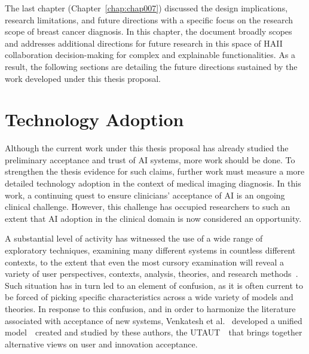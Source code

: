 \clearpage
\label{chap:chap008}

The last chapter (Chapter~\ref{chap:chap007}) discussed the design implications, research limitations, and future directions with a specific focus on the research scope of breast cancer diagnosis.
In this chapter, the document broadly scopes and addresses additional directions for future research in this space of \ac{HAII} collaboration decision-making for complex and explainable functionalities.
As a result, the following sections are detailing the future directions sustained by the work developed under this thesis proposal.

\section{Technology Adoption}
\label{sec:sec008001}

Although the current work under this thesis proposal has already studied the preliminary acceptance and trust of \ac{AI} systems, more work should be done.
To strengthen the thesis evidence for such claims, further work must measure a more detailed technology adoption in the context of medical imaging diagnosis.
In this work, a continuing quest to ensure clinicians' acceptance of \ac{AI} is an ongoing clinical challenge.
However, this challenge has occupied researchers to such an extent that \ac{AI} adoption in the clinical domain is now considered an opportunity.

A substantial level of activity has witnessed the use of a wide range of exploratory techniques, examining many different systems in countless different contexts, to the extent that even the most cursory examination will reveal a variety of user perspectives, contexts, analysis, theories, and research methods~\cite{williams2015unified}.
Such situation has in turn led to an element of confusion, as it is often current to be forced of picking specific characteristics across a wide variety of models and theories.
In response to this confusion, and in order to harmonize the literature associated with acceptance of new systems, Venkatesh et al.~\cite{venkatesh2016unified} developed a unified model~\textendash~created and studied by these authors, the \ac{UTAUT}~\textendash~that brings together alternative views on user and innovation acceptance.

